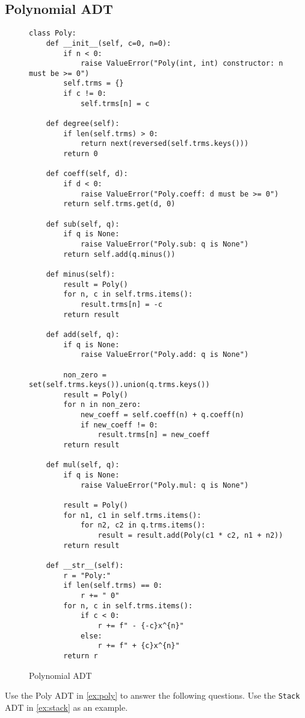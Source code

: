 \documentclass[oneside,11pt,dvipsnames]{book}
\newcommand{\code}[1]{\texttt{#1}}
\begin{document}
\subsection{Polynomial ADT}
\begin{figure}
\begin{lstlisting}
class Poly:
    def __init__(self, c=0, n=0):
        if n < 0:
            raise ValueError("Poly(int, int) constructor: n must be >= 0")
        self.trms = {}
        if c != 0:
            self.trms[n] = c

    def degree(self):
        if len(self.trms) > 0:
            return next(reversed(self.trms.keys()))
        return 0

    def coeff(self, d):
        if d < 0:
            raise ValueError("Poly.coeff: d must be >= 0")
        return self.trms.get(d, 0)

    def sub(self, q):
        if q is None:
            raise ValueError("Poly.sub: q is None")
        return self.add(q.minus())

    def minus(self):
        result = Poly()
        for n, c in self.trms.items():
            result.trms[n] = -c
        return result

    def add(self, q):
        if q is None:
            raise ValueError("Poly.add: q is None")
        
        non_zero = set(self.trms.keys()).union(q.trms.keys())
        result = Poly()
        for n in non_zero:
            new_coeff = self.coeff(n) + q.coeff(n)
            if new_coeff != 0:
                result.trms[n] = new_coeff
        return result

    def mul(self, q):
        if q is None:
            raise ValueError("Poly.mul: q is None")
        
        result = Poly()
        for n1, c1 in self.trms.items():
            for n2, c2 in q.trms.items():
                result = result.add(Poly(c1 * c2, n1 + n2))
        return result

    def __str__(self):
        r = "Poly:"
        if len(self.trms) == 0:
            r += " 0"
        for n, c in self.trms.items():
            if c < 0:
                r += f" - {-c}x^{n}"
            else:
                r += f" + {c}x^{n}"
        return r
\end{lstlisting}
\caption{Polynomial ADT}\label{ex:poly}
\end{figure}


Use the Poly ADT in \autoref{ex:poly} to answer the following questions. Use the \code{Stack} ADT in \autoref{ex:stack} as an example. 
\end{document}
